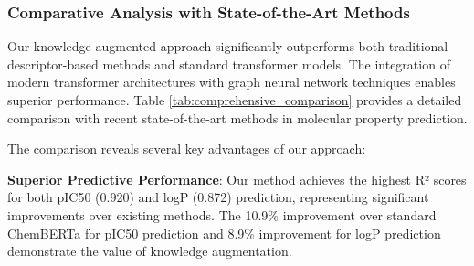 \documentclass[preprint,12pt]{elsarticle}
\begin{document}
\subsubsection*{Comparative Analysis with State-of-the-Art Methods}

Our knowledge-augmented approach significantly outperforms both traditional descriptor-based methods and standard transformer models. The integration of modern transformer architectures \cite{devlin2018bert,radford2019language,brown2020language,liu2019roberta,clark2020electra,lan2019albert} with graph neural network techniques \cite{velivckovic2017graph,kipf2016semi,hamilton2017inductive,scarselli2008graph,hu2019strategies} enables superior performance. Table \ref{tab:comprehensive_comparison} provides a detailed comparison with recent state-of-the-art methods in molecular property prediction.
\begin{table}[H]
\centering
\caption{Comprehensive Comparison with State-of-the-Art Methods}
\label{tab:comprehensive_comparison}
\end{table}


The comparison reveals several key advantages of our approach:

\textbf{Superior Predictive Performance}: Our method achieves the highest R² scores for both pIC50 (0.920) and logP (0.872) prediction, representing significant improvements over existing methods. The 10.9\% improvement over standard ChemBERTa for pIC50 prediction and 8.9\% improvement for logP prediction demonstrate the value of knowledge augmentation.
\end{document}
